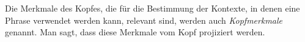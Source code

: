 \documentclass[ number=45
			   ,series=eotms
			   ,printondemand
			  ]{langsci}
\begin{document}
Die Merkmale des Kopfes, die für die Bestimmung der Kontexte, in denen eine Phrase verwendet werden
kann, relevant sind, werden auch \emph{Kopfmerkmale} genannt. Man sagt, dass diese Merkmale vom Kopf
projiziert werden.



                                                    
        
\lipsum 
\lipsum[3-10]  

\newpage

\layout


\backmatter






\cleardoublepage
\small


%
%
%
%

\printindex[aut]
\printindex[lan]
\printindex
\end{document}
